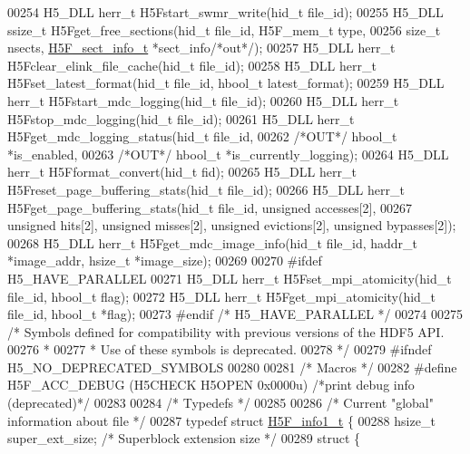 \begin{DoxyCode}
00254 H5\_DLL herr\_t H5Fstart\_swmr\_write(hid\_t file\_id);
00255 H5\_DLL ssize\_t H5Fget\_free\_sections(hid\_t file\_id, H5F\_mem\_t type,
00256     \textcolor{keywordtype}{size\_t} nsects, \hyperlink{struct_h5_f__sect__info__t}{H5F\_sect\_info\_t} *sect\_info\textcolor{comment}{/*out*/});
00257 H5\_DLL herr\_t H5Fclear\_elink\_file\_cache(hid\_t file\_id);
00258 H5\_DLL herr\_t H5Fset\_latest\_format(hid\_t file\_id, hbool\_t latest\_format);
00259 H5\_DLL herr\_t H5Fstart\_mdc\_logging(hid\_t file\_id);
00260 H5\_DLL herr\_t H5Fstop\_mdc\_logging(hid\_t file\_id);
00261 H5\_DLL herr\_t H5Fget\_mdc\_logging\_status(hid\_t file\_id,
00262                                         \textcolor{comment}{/*OUT*/} hbool\_t *is\_enabled,
00263                                         \textcolor{comment}{/*OUT*/} hbool\_t *is\_currently\_logging);
00264 H5\_DLL herr\_t H5Fformat\_convert(hid\_t fid);
00265 H5\_DLL herr\_t H5Freset\_page\_buffering\_stats(hid\_t file\_id);
00266 H5\_DLL herr\_t H5Fget\_page\_buffering\_stats(hid\_t file\_id, \textcolor{keywordtype}{unsigned} accesses[2],
00267     \textcolor{keywordtype}{unsigned} hits[2], \textcolor{keywordtype}{unsigned} misses[2], \textcolor{keywordtype}{unsigned} evictions[2], \textcolor{keywordtype}{unsigned} bypasses[2]);
00268 H5\_DLL herr\_t H5Fget\_mdc\_image\_info(hid\_t file\_id, haddr\_t *image\_addr, hsize\_t *image\_size);
00269 
00270 \textcolor{preprocessor}{#ifdef H5\_HAVE\_PARALLEL}
00271 H5\_DLL herr\_t H5Fset\_mpi\_atomicity(hid\_t file\_id, hbool\_t flag);
00272 H5\_DLL herr\_t H5Fget\_mpi\_atomicity(hid\_t file\_id, hbool\_t *flag);
00273 \textcolor{preprocessor}{#endif }\textcolor{comment}{/* H5\_HAVE\_PARALLEL */}\textcolor{preprocessor}{}
00274 
00275 \textcolor{comment}{/* Symbols defined for compatibility with previous versions of the HDF5 API.}
00276 \textcolor{comment}{ *}
00277 \textcolor{comment}{ * Use of these symbols is deprecated.}
00278 \textcolor{comment}{ */}
00279 \textcolor{preprocessor}{#ifndef H5\_NO\_DEPRECATED\_SYMBOLS}
00280 
00281 \textcolor{comment}{/* Macros */}
00282 \textcolor{preprocessor}{#define H5F\_ACC\_DEBUG   (H5CHECK H5OPEN 0x0000u)    }\textcolor{comment}{/*print debug info (deprecated)*/}\textcolor{preprocessor}{}
00283 
00284 \textcolor{comment}{/* Typedefs */}
00285 
00286 \textcolor{comment}{/* Current "global" information about file */}
00287 \textcolor{keyword}{typedef} \textcolor{keyword}{struct }\hyperlink{struct_h5_f__info1__t}{H5F\_info1\_t} \{
00288     hsize\_t     super\_ext\_size; \textcolor{comment}{/* Superblock extension size */}
00289     \textcolor{keyword}{struct }\{

\end{DoxyCode}
